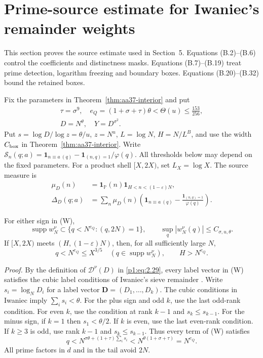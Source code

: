 \section{Prime-source estimate for Iwaniec's remainder weights}
\label{app:proof-aa37}
\begingroup
\setcounter{lemma}{0}
\renewcommand{\thelemma}{B.\arabic{lemma}}

This section proves the source estimate used in Section~5. Equations
(B.2)--(B.6) control the coefficients and distinctness masks.
Equations (B.7)--(B.19) treat prime detection, logarithm freezing and
boundary boxes. Equations (B.20)--(B.32) bound the retained boxes.

Fix the parameters in Theorem~\ref{thm:aa37-interior} and put
\[
 \begin{gathered}
 \tau=\sigma^9,\quad
 e_Q=(1+\sigma+\tau)\theta<\Theta(u)\le\frac{153}{256},\\
 D=N^{\theta},\quad Y=D^{\sigma^2}.
 \end{gathered}
\]
Put $s=\log D/\log z=\theta/u$, $z=N^u$, $L=\log N$,
$H=N/L^B$, and use the width $C_{\rm box}$ in
Theorem~\ref{thm:aa37-interior}. Write
$\mathcal S_n(q;a)=\mathbf1_{n\equiv a\ (q)}
-\mathbf1_{(n,q)=1}/\varphi(q)$.
All thresholds below may depend on the fixed parameters. For a product
shell $[X,2X)$, set $L_X=\log X$. The source measure is
\[
 \begin{aligned}
 \mu_D(n)&=\mathbf1_{\mathbb P}(n)
          \mathbf1_{H<n<(1-\varepsilon)N},\\
 \Delta_D(q;a)&=\sum_n\mu_D(n)
 \left(\mathbf1_{n\equiv a\ (q)}
       -\frac{\mathbf1_{(n,q)=1}}{\varphi(q)}\right).
 \end{aligned}
 \tag{B.1}
\]

\begin{lemma}\label{lem:aa37-support}
For either sign in \textup{(W)},
\[
 \operatorname{supp}w_N^\nu\subset
 \{q<N^{e_Q}:(q,2N)=1\},\qquad
 \sup_q|w_N^\nu(q)|\le C_{\sigma,u,\theta}.
 \tag{B.2}
\]
If $[X,2X)$ meets $(H,(1-\varepsilon)N)$, then, for all sufficiently large $N$,
\[
 q<N^{e_Q}\le X^{3/5}
 \quad(q\in\operatorname{supp}w_N^\nu),\qquad H>N^{e_Q}.
 \tag{B.3}
\]
\end{lemma}

\emph{Proof.} By the definition of $\mathcal D^\nu(D)$ in \eqref{p1:eq:2.29},
every label vector in (W) satisfies the cubic label conditions of Iwaniec's
sieve remainder \cite[Theorem~4]{AA37}. Write
$s_i=\log_ND_i$ for a label vector
$\mathbf D=(D_1,\ldots,D_k)$. The cubic conditions in Iwaniec imply
$\sum_i s_i<\theta$. For the plus sign and odd $k$, use the last odd-rank condition.
For even $k$, use the condition at rank $k-1$
and $s_k\le s_{k-1}$. For the minus sign, if $k=1$ then
$s_1<\theta/2$. If $k$ is even, use the last even-rank condition.
If $k\ge3$ is odd, use rank $k-1$ and $s_k\le s_{k-1}$. Thus every
term of (W) satisfies
\[
 q<N^{\sigma \theta+(1+\tau)\sum_i s_i}
   <N^{\theta(1+\sigma+\tau)}=N^{e_Q}.
\]
All prime factors in $d$ and in the tail avoid $2N$.

